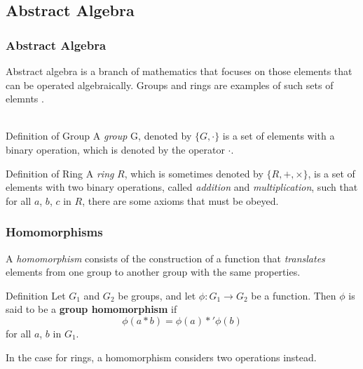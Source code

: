 \documentclass{beamer}
\begin{document}
\subsection{Abstract Algebra}
\begin{frame}
\frametitle{Abstract Algebra}

Abstract algebra is a branch of mathematics that focuses on those elements that can be operated algebraically. Groups and rings are examples of such sets of elemnts \cite{CryptoStallings}. \\~\\
\begin{block}{Definition of Group}
A \emph{group} G, denoted by $\{ G, \cdot \}$ is a set of elements with a binary operation, which is denoted by the operator $\cdot$.
\end{block}

\begin{block}{Definition of Ring}
A \emph{ring} $R$, which is sometimes denoted by $\{R, +, \times \}$, is a set of elements with two binary operations, called \textit{addition} and \textit{multiplication}, such that for all $a$, $b$, $c$ in $R$, there are some axioms that must be obeyed.
\end{block}

\end{frame}


\begin{frame}
\frametitle{Homomorphisms}

A \emph{homomorphism} consists of the construction of a function that \emph{translates} elements from one group to another group with the same properties.

\begin{block}{Definition}
Let $G_{1}$ and $G_{2}$ be groups, and let $\phi: G_{1} \rightarrow G_{2}$ be a function. Then $\phi$ is said to be a \textbf{group homomorphism} if
\begin{equation}
\phi(a*b) = \phi(a) *' \phi(b)
\end{equation}
for all $a$, $b$ in $G_{1}$.
\end{block}

In the case for rings, a homomorphism considers two operations instead.

\end{frame}

\end{document}
